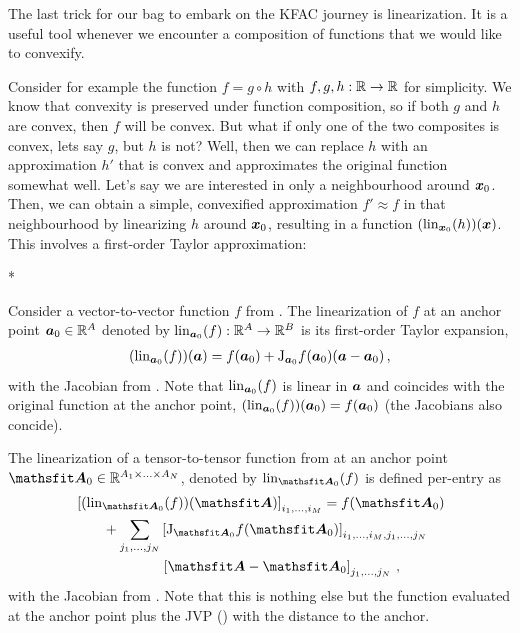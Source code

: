 The last trick for our bag to embark on the KFAC journey is linearization.
It is a useful tool whenever we encounter a composition of functions that we would like to convexify.

Consider for example the function $f = g \circ h$ with $f,g,h: {\mathbb{R}} \to {\mathbb{R}}$ for simplicity.
We know that convexity is preserved under function composition, so if both $g$ and $h$ are convex, then $f$ will be convex.
But what if only one of the two composites is convex, lets say $g$, but $h$ is not?
Well, then we can replace $h$ with an approximation $h'$ that is convex and approximates the original function somewhat well.
Let's say we are interested in only a neighbourhood around ${\bm{x}}_0$.
Then, we can obtain a simple, convexified approximation $f' \approx f$ in that neighbourhood by linearizing $h$ around ${\bm{x}}_0$, resulting in a function $(\operatorname{lin}_{{\bm{x}}_0}(h))({\bm{x}})$.
This involves a first-order Taylor approximation:

\switchcolumn[1]*
\switchcolumn[0]

\begin{definition}\label{def:vector_linearization}
  Consider a vector-to-vector function $f$ from .
  The linearization of $f$ at an anchor point ${\bm{a}}_0 \in {\mathbb{R}}^A$ denoted by $\operatorname{lin}_{{\bm{a}}_0}(f): {\mathbb{R}}^A \to {\mathbb{R}}^B$ is its first-order Taylor expansion,
  \begin{align*}
    (\operatorname{lin}_{{\bm{a}}_0}(f))({\bm{a}}) = f({\bm{a}}_0) + \mathrm{J}_{{\bm{a}}_0}f({\bm{a}}_0) ({\bm{a}} - {\bm{a}}_0)\,,
  \end{align*}
  with the Jacobian from .
  Note that $\operatorname{lin}_{{\bm{a}}_0}(f)$ is linear in ${\bm{a}}$ and coincides with the original function at the anchor point, $(\operatorname{lin}_{{\bm{a}}_0}(f))({\bm{a}}_0) = f({\bm{a}}_0)$ (the Jacobians also concide).
\end{definition}

\begin{definition}\label{def:tensor_linearization}
  The linearization of a tensor-to-tensor function from  at an anchor point $\tA_0 \in \sR^{A_1 \times \ldots \times A_N}$, denoted by $\lin_{\tA_0}(f)$ is defined per-entry as
  \begin{align*}
     & \left[
      (\lin_{\tA_0}(f))(\tA)
      \right]_{i_1, \ldots, i_M} = f(\tA_0)
    \\
     & \hspace{2em}+
    \sum_{j_1, \ldots, j_N}
    \left[
      \jac_{\tA_0}f(\tA_0)
      \right]_{i_1, \ldots, i_M, j_1, \ldots, j_N}
    \\
     & \hspace{6.2em}\left[
      \tA - \tA_0
      \right]_{j_1, \ldots, j_N}\,,
  \end{align*}
  with the Jacobian from . Note that this is nothing else but the function evaluated at the anchor point plus the JVP () with the distance to the anchor.
\end{definition}

